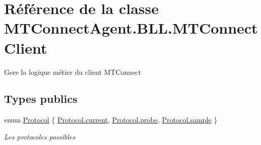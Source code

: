 \hypertarget{class_m_t_connect_agent_1_1_b_l_l_1_1_m_t_connect_client}{}\section{Référence de la classe M\+T\+Connect\+Agent.\+B\+L\+L.\+M\+T\+Connect\+Client}
\label{class_m_t_connect_agent_1_1_b_l_l_1_1_m_t_connect_client}


Gere la logique métier du client M\+T\+Connect  


\subsection*{Types publics}
\begin{DoxyCompactItemize}
\item 
enum \mbox{\hyperlink{class_m_t_connect_agent_1_1_b_l_l_1_1_m_t_connect_client_a2f390f74a0ad3ee5147e9438ceed6474}{Protocol}} \{ \mbox{\hyperlink{class_m_t_connect_agent_1_1_b_l_l_1_1_m_t_connect_client_a2f390f74a0ad3ee5147e9438ceed6474a43b5c9175984c071f30b873fdce0a000}{Protocol.\+current}}, 
\mbox{\hyperlink{class_m_t_connect_agent_1_1_b_l_l_1_1_m_t_connect_client_a2f390f74a0ad3ee5147e9438ceed6474a8da843ff65205a61374b09b81ed0fa35}{Protocol.\+probe}}, 
\mbox{\hyperlink{class_m_t_connect_agent_1_1_b_l_l_1_1_m_t_connect_client_a2f390f74a0ad3ee5147e9438ceed6474a5e8ff9bf55ba3508199d22e984129be6}{Protocol.\+sample}}
 \}
\begin{DoxyCompactList}\small\item\em Les protocoles possibles \end{DoxyCompactList}\end{DoxyCompactItemize}
